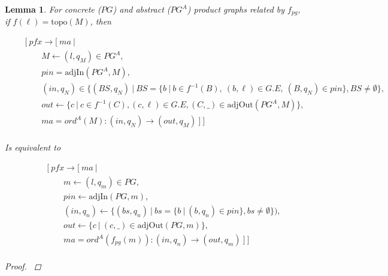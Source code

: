 \documentclass[twocolumn, openany]{sig-alternate-10pt}
\newcommand{\Topo}{\ensuremath{\mathrm{topo}}}
\newtheorem{lem}[thm]{Lemma}
\begin{document}
\begin{lem}

  For concrete ($PG$) and abstract ($PG^A$) product graphs related by $f_{pg}$, if $f(\ell) = \Topo(M)$, then

  \[ \begin{array}{l}
     ~~~~~~~~~ [~ pfx \rightarrow [~ ma~\vert~ \\
     ~~~~~~~~~~~~~~~~~~ M \leftarrow (l,q_M) \in PG^A, \\
     ~~~~~~~~~~~~~~~~~~ pin = \mathrm{adjIn}(PG^A,M), \\
     ~~~~~~~~~~~~~~~~~~ (in,q_N) \in \{(BS,q_N) ~\vert~ BS=\{b ~\vert~ b \in f^{-1}(B),~ (b,\ell) \in G.E,~ (B,q_N) \in pin \}, BS \neq \emptyset  \}, \\
     ~~~~~~~~~~~~~~~~~~ out \leftarrow \{ c ~\vert~ c \in f^{-1}(C), (c,\ell) \in G.E, (C,\_) \in \mathrm{adjOut}(PG^A,M) \}, \\
     ~~~~~~~~~~~~~~~~~~ ma = ord^A(M) : (in,q_N) \rightarrow (out,q_M) ~] ~] \\
  \end{array} \]%

  Is equivalent to

  \[ \begin{array}{l}
     ~~~~~~~~~ [~ pfx \rightarrow [~ ma ~\vert~ \\
     ~~~~~~~~~~~~~~~~~~ m \leftarrow (l,q_m) \in PG, \\
     ~~~~~~~~~~~~~~~~~~ pin \leftarrow \mathrm{adjIn}(PG,m), \\
     ~~~~~~~~~~~~~~~~~~ (in,q_n) \leftarrow \{ (bs,q_n) ~\vert~ bs=\{ b ~\vert~ (b,q_n) \in pin\}, bs \neq \emptyset \}), \\
     ~~~~~~~~~~~~~~~~~~ out \leftarrow \{ c ~\vert~ (c,\_) \in \mathrm{adjOut}(PG,m) \}, \\
     ~~~~~~~~~~~~~~~~~~ ma = ord^A(f_{pg}(m)) : (in,q_n) \rightarrow (out,q_m) ~] ~] \\
  \end{array} \]%

  \begin{proof}
    $ $
    \vspace{.4em}


\end{proof}
\end{lem}
\end{document}
